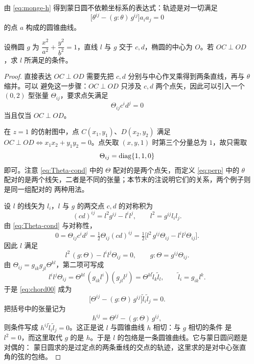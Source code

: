 由 \eqref{eq:monge-h} 得到蒙日圆不依赖坐标系的表达式：轨迹是对一切满足
\[
\bigl[\theta^{ij}-(g:\theta)\,g^{ij}\bigr]a_ia_j=0
\]
的点 $a$ 构成的圆锥曲线。

\begin{example}[对中心张直角的动弦]
设椭圆 $g$ 为 $\dfrac{x^2}{a^2}+\dfrac{y^2}{b^2}=1$，直线 $l$ 与 $g$ 交于 $c,d$，椭圆的中心为
$O$。若 $OC\perp OD$，求 $l$ 所满足的条件。
\end{example}

\begin{proof}
直接表达 $OC\perp OD$ 需要先把 $c,d$ 分别与中心作叉乘得到两条直线，再与 $\theta$ 缩并。可以
避免这一步骤：$OC\perp OD$ 只涉及 $c,d$ 两个点矢，因此可以引入一个 $(0,2)$ 型张量
$\Theta_{ij}$，要求点矢满足
\begin{equation}
\Theta_{ij}c^id^j=0
\label{eq:Theta-cond}
\end{equation}
当且仅当 $OC\perp OD$。

在 $z=1$ 的仿射图中，点 $C(x_1,y_1)$、$D(x_2,y_2)$ 满足
$OC\perp OD\iff x_1x_2+y_1y_2=0$。点矢取 $(x,y,1)$ 时第三个分量总为 $1$，故只需取
\begin{equation}
\Theta_{ij}=\operatorname{diag}\{1,1,0\}
\label{eq:Theta-comp}
\end{equation}
即可。注意 \eqref{eq:Theta-cond} 中的 $\Theta$ 配对的是两个点矢，而定义 \eqref{eq:perp} 中的
$\theta$ 配对的是两个线矢，二者是不同的张量；本节末的注说明它们的关系，两个例子则是同一组配对的
两种用法。

设 $l$ 的线矢为 $l_i$，$l$ 与 $g$ 的两交点 $c,d$ 的对称积为
\[
(cd)^{ij}=l^2g^{ij}-l^il^j,\qquad l^2=g^{ij}l_il_j .
\]
由 \eqref{eq:Theta-cond} 与对称性，
\[
0=\Theta_{ij}c^id^j=\tfrac12\Theta_{ij}(cd)^{ij}
=\tfrac12\bigl[l^2\,g^{ij}\Theta_{ij}-l^il^j\Theta_{ij}\bigr].
\]
因此 $l$ 满足
\begin{equation}
l^2\,(g:\Theta)-l^il^j\Theta_{ij}=0,
\qquad g:\Theta=g^{ij}\Theta_{ij}.
\label{eq:chord00}
\end{equation}
由 $\Theta_{ij}=g_{ik}g_{jl}\Theta^{kl}$，第二项可写成
\[
l^il^j\Theta_{ij}=\Theta^{kl}\,(g_{ik}l^i)(g_{jl}l^j)
=\Theta^{kl}\tilde l_k\tilde l_l,
\qquad \tilde l_i=g_{ik}l^k .
\]
于是 \eqref{eq:chord00} 成为
\[
\bigl[\Theta^{ij}-(g:\Theta)\,g^{ij}\bigr]\tilde l_i\tilde l_j=0 .
\]
把括号中的张量记为
\begin{equation}
h^{ij}=\Theta^{ij}-(g:\Theta)\,g^{ij},
\label{eq:chord-h}
\end{equation}
则条件写成 $h^{ij}\tilde l_i\tilde l_j=0$。这正是说 $l$ 与圆锥曲线 $h$ 相切：与 $g$ 相切的条件
是 $l^2=0$，而这里取代 $g$ 的是 $h$。于是 $l$ 的包络是一条圆锥曲线。它与蒙日圆问题是对偶的：
蒙日圆求的是过定点的两条垂线的交点的轨迹，这里求的是对中心张直角的弦的包络。


\end{proof}
